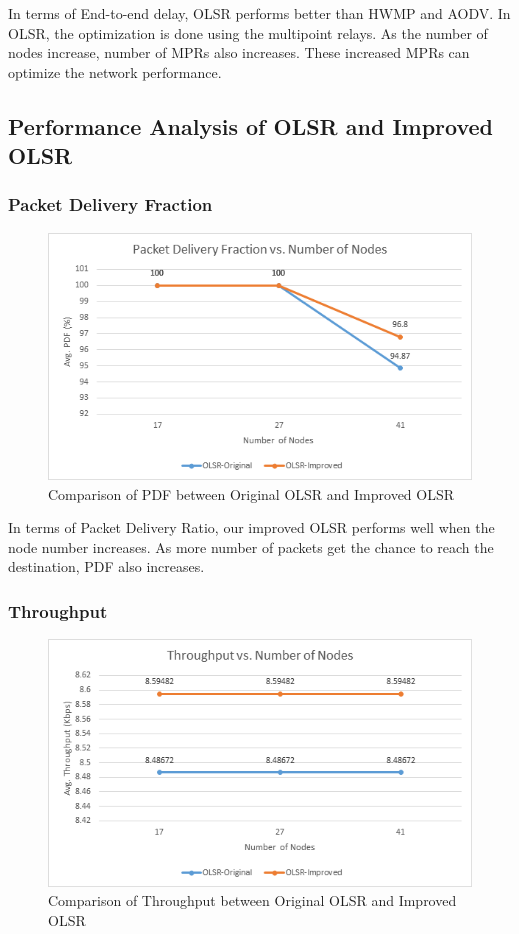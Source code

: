 \documentclass[12pt,a4paper]{report}
\begin{document}
In terms of End-to-end delay, OLSR performs better than HWMP and AODV. In OLSR, the optimization is done using the multipoint relays. As the number of nodes increase, number of MPRs also increases. These increased MPRs can optimize the network performance.


\subsection{Performance Analysis of OLSR and Improved OLSR}
\subsubsection{Packet Delivery Fraction}
\begin{figure}[hbtp]
\centering
\includegraphics[scale=.7]{Graphs/OLSR-pdf-vs-nodes.png}
\caption{Comparison of PDF between Original OLSR and Improved OLSR}
\end{figure}

In terms of Packet Delivery Ratio, our improved OLSR performs well when the node number increases. As more number of packets get the chance to reach the destination, PDF also increases. 

\newpage

\subsubsection{Throughput}

\begin{figure}[hbtp]
\centering
\includegraphics[scale=.7]{Graphs/OLSR-throughput-vs-nodes.png}
\caption{Comparison of Throughput between Original OLSR and Improved OLSR}
\end{figure}
\end{document}
